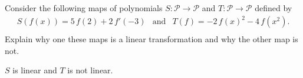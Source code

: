 
\begin{exerciseStatement}


Consider the following maps of polynomials \(S:\mathcal{P}\rightarrow\mathcal{P}\) and \(T:\mathcal{P}\rightarrow\mathcal{P}\) defined by 
\begin{align*} S(f(x))= 5 \, f\left(2\right) + 2 \, f'\left(-3\right)  & \text{and} & T(f)= -2 \, f\left(x\right)^{2} - 4 \, f\left(x^{2}\right) . \\ \end{align*}
             Explain why one these maps is a linear transformation and why the other map is not. 


\end{exerciseStatement}
    
\begin{exerciseAnswer} 


\(S\) is linear and \(T\) is not linear.


\end{exerciseAnswer}
    
